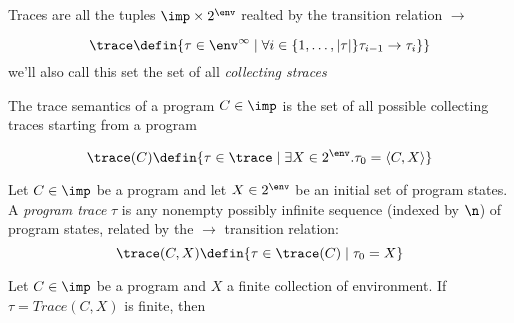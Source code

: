 \begin{definition}[Trace]
  Traces are all the tuples \(\imp \times 2^\env\) realted by the
  transition relation \(\to\)

  \[\trace \defin \{\tau \in \env^\infty \mid \forall i \in \{1, \dots, |\tau|\} \tau_{i-1} \to \tau_i\} \}\]
  we'll also call this set the set of all \emph{collecting straces}
\end{definition}

\begin{definition}
  The trace semantics of a program \(C\in\imp\) is the set of all
  possible collecting traces starting from a program
  
  \[\trace(C) \defin \{\tau \in \trace \mid \exists X \in 2^\env . \tau_0 = \langle C, X \rangle \}\]

\end{definition}

\begin{definition}
  Let \(C \in \imp\) be a program and let \(X \in 2^\env\) be an
  initial set of program states.  A \emph{program trace} \(\tau\) is
  any nonempty possibly infinite sequence (indexed by \(\n\)) of
  program states, related by the \(\to\) transition relation:
  \[\trace(C, X) \defin \{\tau \in \trace(C) \mid \tau_0 = X\} \]
\end{definition}

\begin{theorem}
  Let \(C\in\imp\) be a program and \(X\) a finite collection of
  environment. If \(\tau = Trace(C,X)\) is finite, then 
\end{theorem}
